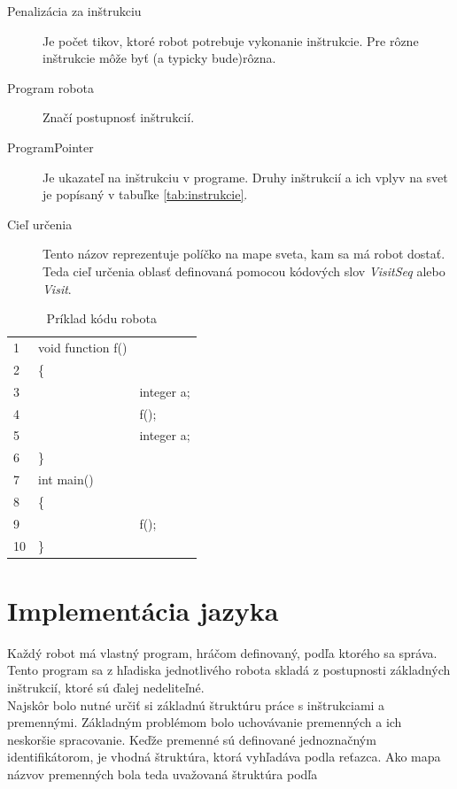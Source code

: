 \begin{description}
\item[Penalizácia za inštrukciu]
	Je počet tikov, ktoré robot potrebuje vykonanie inštrukcie. Pre rôzne inštrukcie môže byť (a typicky bude)rôzna.
\item [Program robota] 
	Značí postupnosť inštrukcií.
\item [ProgramPointer]
 	Je ukazateľ na inštrukciu v programe. Druhy inštrukcií a ich vplyv na svet je popísaný v tabuľke \ref{tab:instrukcie}.
\item[Cieľ určenia]
	Tento názov reprezentuje políčko na mape sveta, kam sa má robot dostať. Teda cieľ určenia oblasť definovaná pomocou kódových slov \emph{VisitSeq} alebo \emph{Visit}.
\end{description}

\begin{table}
\centering
\begin{tabular}{| lll |}
\hline
1&void function f()&\\
2&\{&\\
3&&integer a;\\
4&&f();\\
5&&integer a;\\
6&\}&\\
7&int main()&\\
8&\{&\\
9&&	f();\\
10&\}&\\
\hline
\end{tabular}
\caption{ Príklad kódu robota }
\label{tab:rek}
\end{table}


\section{Implementácia jazyka}
Každý robot má vlastný program, hráčom definovaný, podľa ktorého sa správa. Tento program sa z hľadiska jednotlivého robota skladá z postupnosti základných inštrukcií, ktoré sú ďalej nedeliteľné. \\ 
Najskôr bolo nutné určiť si základnú štruktúru práce s inštrukciami a premennými. Základným problémom bolo uchovávanie premenných a ich neskoršie spracovanie. Keďže premenné sú definované jednoznačným identifikátorom, je vhodná štruktúra, ktorá vyhľadáva podla reťazca. Ako mapa názvov premenných bola teda uvažovaná štruktúra podľa \cite{trees}
